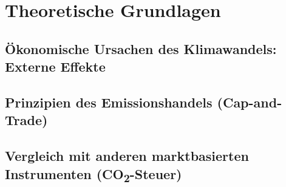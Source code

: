 \chapter{Theoretische Grundlagen}

\section{Ökonomische Ursachen des Klimawandels: Externe Effekte}

\section{Prinzipien des Emissionshandels (Cap-and-Trade)}

\section{Vergleich mit anderen marktbasierten Instrumenten (CO\textsubscript{2}-Steuer)}






\nocite{*}